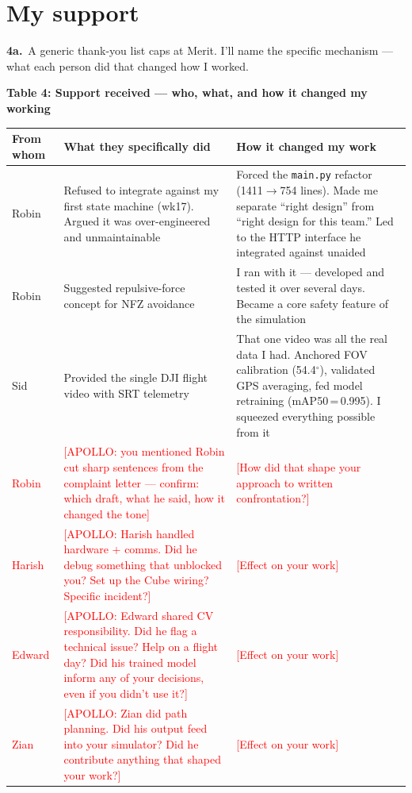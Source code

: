 \section{My support}

\textbf{4a.}~A generic thank-you list caps at Merit. I'll name the specific mechanism --- what each person did that changed how I worked.

\vspace{0.2em}
{\small
\noindent\textbf{Table 4: Support received --- who, what, and how it changed my working}

\begin{tabularx}{\textwidth}{@{}l L L@{}}
\toprule
\textbf{From whom} & \textbf{What they specifically did} & \textbf{How it changed my work} \\
\midrule
Robin & Refused to integrate against my first state machine (wk17). Argued it was over-engineered and unmaintainable & Forced the \texttt{main.py} refactor (1411$\to$754 lines). Made me separate ``right design'' from ``right design for this team.'' Led to the HTTP interface he integrated against unaided \\
Robin & Suggested repulsive-force concept for NFZ avoidance & I ran with it --- developed and tested it over several days. Became a core safety feature of the simulation \\
Sid & Provided the single DJI flight video with SRT telemetry & That one video was all the real data I had. Anchored FOV calibration (54.4$^\circ$), validated GPS averaging, fed model retraining (mAP50\,=\,0.995). I squeezed everything possible from it \\
\textcolor{red}{Robin} & \textcolor{red}{[APOLLO: you mentioned Robin cut sharp sentences from the complaint letter --- confirm: which draft, what he said, how it changed the tone]} & \textcolor{red}{[How did that shape your approach to written confrontation?]} \\
\textcolor{red}{Harish} & \textcolor{red}{[APOLLO: Harish handled hardware + comms. Did he debug something that unblocked you? Set up the Cube wiring? Specific incident?]} & \textcolor{red}{[Effect on your work]} \\
\textcolor{red}{Edward} & \textcolor{red}{[APOLLO: Edward shared CV responsibility. Did he flag a technical issue? Help on a flight day? Did his trained model inform any of your decisions, even if you didn't use it?]} & \textcolor{red}{[Effect on your work]} \\
\textcolor{red}{Zian} & \textcolor{red}{[APOLLO: Zian did path planning. Did his output feed into your simulator? Did he contribute anything that shaped your work?]} & \textcolor{red}{[Effect on your work]} \\
\bottomrule
\end{tabularx}
}
\vspace{0.2em}

